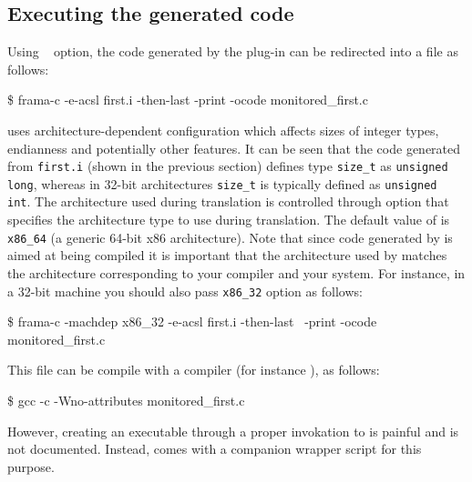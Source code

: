 
\subsection{Executing the generated code}
\label{sec:exec}

Using  \framac~\cite{userman} option, the code generated by the
\eacsl plug-in can be redirected into a file as follows:
\begin{frama-c-commands}
\$ frama-c -e-acsl first.i -then-last -print -ocode monitored_first.c
\end{frama-c-commands}

\framac uses architecture-dependent configuration which
affects sizes of integer types, endianness and potentially other features.  It
can be seen that the code generated from \texttt{first.i} (shown in the
previous section) defines \C type \texttt{size\_t} as \texttt{unsigned long}, whereas
in 32-bit architectures \texttt{size\_t} is typically defined as
\texttt{unsigned int}. The architecture used during \framac translation is
controlled through \framac {} option that specifies the
architecture type to use during translation.  The default value of
 is \texttt{x86\_64} (a generic 64-bit x86 architecture).
Note that since code generated by \eacsl is aimed at being compiled it is
important that the architecture used by \framac matches the architecture
corresponding to your compiler and your system. For instance, in a 32-bit
machine you should also pass
 \texttt{x86\_32} option as follows:
\begin{frama-c-commands}
\$ frama-c -machdep x86_32 -e-acsl first.i -then-last \
  -print -ocode monitored_first.c
\end{frama-c-commands}

This file can be compile with a \C compiler (for instance \gcc), as follows:

\lstset{escapechar=£}
\begin{frama-c-commands}
\$ gcc -c -Wno-attributes monitored_first.c
\end{frama-c-commands}

However, creating an executable through a proper invokation to \gcc is painful
and is not documented. Instead, \eacsl comes with a companion wrapper script for
this purpose.

